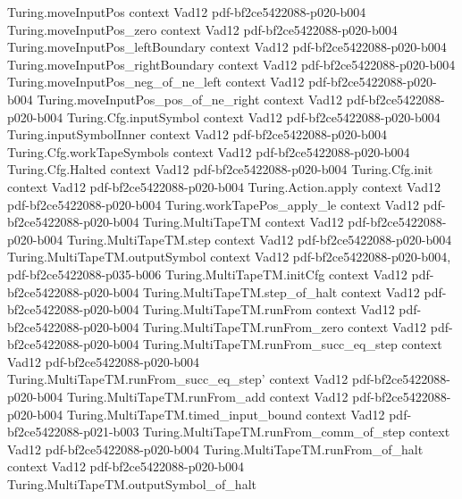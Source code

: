 \begin{theorem}
  {Turing.moveInputPos}
  {context}
  {Vad12}
  {pdf-bf2ce5422088-p020-b004}
\proofstep
  {Turing.moveInputPos_zero}
  {context}
  {Vad12}
  {pdf-bf2ce5422088-p020-b004}
\proofstep
  {Turing.moveInputPos_leftBoundary}
  {context}
  {Vad12}
  {pdf-bf2ce5422088-p020-b004}
\proofstep
  {Turing.moveInputPos_rightBoundary}
  {context}
  {Vad12}
  {pdf-bf2ce5422088-p020-b004}
\proofstep
  {Turing.moveInputPos_neg_of_ne_left}
  {context}
  {Vad12}
  {pdf-bf2ce5422088-p020-b004}
\proofstep
  {Turing.moveInputPos_pos_of_ne_right}
  {context}
  {Vad12}
  {pdf-bf2ce5422088-p020-b004}
\proofstep
  {Turing.Cfg.inputSymbol}
  {context}
  {Vad12}
  {pdf-bf2ce5422088-p020-b004}
\proofstep
  {Turing.inputSymbolInner}
  {context}
  {Vad12}
  {pdf-bf2ce5422088-p020-b004}
\proofstep
  {Turing.Cfg.workTapeSymbols}
  {context}
  {Vad12}
  {pdf-bf2ce5422088-p020-b004}
\proofstep
  {Turing.Cfg.Halted}
  {context}
  {Vad12}
  {pdf-bf2ce5422088-p020-b004}
\proofstep
  {Turing.Cfg.init}
  {context}
  {Vad12}
  {pdf-bf2ce5422088-p020-b004}
\proofstep
  {Turing.Action.apply}
  {context}
  {Vad12}
  {pdf-bf2ce5422088-p020-b004}
\proofstep
  {Turing.workTapePos_apply_le}
  {context}
  {Vad12}
  {pdf-bf2ce5422088-p020-b004}
\proofstep
  {Turing.MultiTapeTM}
  {context}
  {Vad12}
  {pdf-bf2ce5422088-p020-b004}
\proofstep
  {Turing.MultiTapeTM.step}
  {context}
  {Vad12}
  {pdf-bf2ce5422088-p020-b004}
\proofstep
  {Turing.MultiTapeTM.outputSymbol}
  {context}
  {Vad12}
  {pdf-bf2ce5422088-p020-b004,
    pdf-bf2ce5422088-p035-b006}
\proofstep
  {Turing.MultiTapeTM.initCfg}
  {context}
  {Vad12}
  {pdf-bf2ce5422088-p020-b004}
\proofstep
  {Turing.MultiTapeTM.step_of_halt}
  {context}
  {Vad12}
  {pdf-bf2ce5422088-p020-b004}
\proofstep
  {Turing.MultiTapeTM.runFrom}
  {context}
  {Vad12}
  {pdf-bf2ce5422088-p020-b004}
\proofstep
  {Turing.MultiTapeTM.runFrom_zero}
  {context}
  {Vad12}
  {pdf-bf2ce5422088-p020-b004}
\proofstep
  {Turing.MultiTapeTM.runFrom_succ_eq_step}
  {context}
  {Vad12}
  {pdf-bf2ce5422088-p020-b004}
\proofstep
  {Turing.MultiTapeTM.runFrom_succ_eq_step'}
  {context}
  {Vad12}
  {pdf-bf2ce5422088-p020-b004}
\proofstep
  {Turing.MultiTapeTM.runFrom_add}
  {context}
  {Vad12}
  {pdf-bf2ce5422088-p020-b004}
\proofstep
  {Turing.MultiTapeTM.timed_input_bound}
  {context}
  {Vad12}
  {pdf-bf2ce5422088-p021-b003}
\proofstep
  {Turing.MultiTapeTM.runFrom_comm_of_step}
  {context}
  {Vad12}
  {pdf-bf2ce5422088-p020-b004}
\proofstep
  {Turing.MultiTapeTM.runFrom_of_halt}
  {context}
  {Vad12}
  {pdf-bf2ce5422088-p020-b004}
\proofstep
  {Turing.MultiTapeTM.outputSymbol_of_halt}

\end{theorem}
